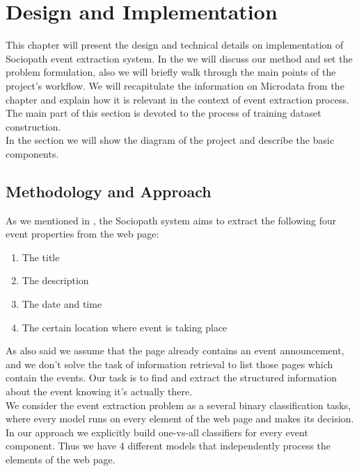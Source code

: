\chapter{Design and Implementation}
\label{chap:design}
This chapter will present the design and technical details on implementation of Sociopath event extraction system. In the  we will discuss our method and set the problem formulation, also we will briefly walk through the main points of the project's workflow. We will recapitulate the information on Microdata from the chapter and explain how it is relevant in the context of event extraction process. The main part of this section is devoted to the process of training dataset construction. \\

In the section  we will show the diagram of the project and describe the basic components. 

\section{Methodology and Approach}
\label{sec:method}
As we mentioned in , the Sociopath system aims to extract the following four event properties from the web page: 

\begin{enumerate}
    \item The title
    \item The description
    \item The date and time
    \item The certain location where event is taking place
\end{enumerate}

As also said we assume that the page already contains an event announcement, and we don't solve the task of information retrieval to list those pages which contain the events. Our task is to find and extract the structured information about the event knowing it's actually there.\\

We consider the event extraction problem as a several binary classification tasks, where every model runs on every element of the web page and makes its decision. In our approach we explicitly build one-vs-all classifiers for every event component. Thus we have 4 different models that independently process the elements of the web page. \\

